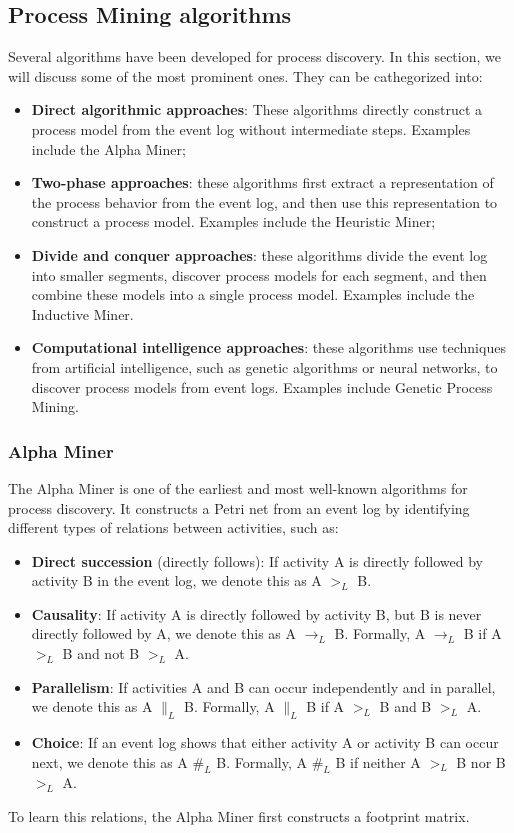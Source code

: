 \subsection{Process Mining algorithms}
Several algorithms have been developed for process discovery. In this section, we will discuss some of the most prominent ones.
They can be cathegorized into:
\begin{itemize}
    \item \textbf{Direct algorithmic approaches}: These algorithms directly construct a process model from the event log without intermediate steps. Examples include the Alpha Miner;
    \item \textbf{Two-phase approaches}: these algorithms first extract a representation of the process behavior from the event log, and then use this representation to construct a process model. Examples include the Heuristic Miner;
    \item \textbf{Divide and conquer approaches}: these algorithms divide the event log into smaller segments, discover process models for each segment, and then combine these models into a single process model. Examples include the Inductive Miner.
    \item \textbf{Computational intelligence approaches}: these algorithms use techniques from artificial intelligence, such as genetic algorithms or neural networks, to discover process models from event logs. Examples include Genetic Process Mining.
\end{itemize}

\subsubsection{Alpha Miner}
The Alpha Miner is one of the earliest and most well-known algorithms for process discovery. It constructs a Petri net from an event log by identifying different types of relations between activities, such as:
\begin{itemize}
    \item \textbf{Direct succession} (directly follows): If activity A is directly followed by activity B in the event log, we denote this as A $>_L$ B.
    \item \textbf{Causality}: If activity A is directly followed by activity B, but B is never directly followed by A, we denote this as A $\to_L$ B. Formally, A $\to_L$ B if A $>_L$ B and not B $>_L$ A.
    \item \textbf{Parallelism}: If activities A and B can occur independently and in parallel, we denote this as A $\parallel_L$ B. Formally, A $\parallel_L$ B if A $>_L$ B and B $>_L$ A.
    \item \textbf{Choice}: If an event log shows that either activity A or activity B can occur next, we denote this as A $\text{\#}_L$ B. Formally, A $\text{\#}_L$ B if neither A $>_L$ B nor B $>_L$ A.
\end{itemize}
To learn this relations, the Alpha Miner first constructs a footprint matrix.
